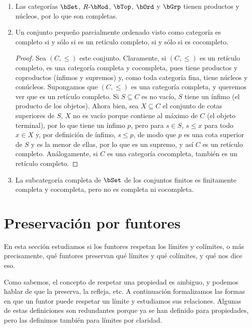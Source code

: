 \begin{example}\;
  \begin{enumerate}
  \item Las categorías $\bSet$, $R\dash\bMod$, $\bTop$, $\bOrd$ y $\bGrp$ tienen
    productos y núcleos, por lo que son completas.\pagebreak
  \item Un conjunto pequeño parcialmente ordenado visto como categoría es
    completo si y sólo si es un retículo completo, si y sólo si es
    cocompleto.\nopagebreak
    \begin{proof}
      Sea $(C,\leq)$ este conjunto. Claramente, si $(C,\leq)$ es un retículo
      completo, es una categoría completa y cocompleta, pues tiene productos y
      coproductos (ínfimos y supremos) y, como toda categoría fina, tiene
      núcleos y conúcleos. Supongamos que $(C,\leq)$ es una categoría completa,
      y queremos ver que es un retículo completo. Si $S\subseteq C$ es no vacío,
      $S$ tiene un ínfimo (el producto de los objetos). Ahora bien, sea
      $X\subseteq C$ el conjunto de cotas superiores de $S$, $X$ no es vacío
      porque contiene al máximo de $C$ (el objeto terminal), por lo que tiene un
      ínfimo $p$, pero para $s\in S$, $s\leq x$ para todo $x\in X$ y, por
      definición de ínfimo, $s\leq p$, de modo que $p$ es una cota superior de
      $S$ y es la menor de ellas, por lo que es un supremo, y así $C$ es un
      retículo completo. Análogamente, si $C$ es una categoría cocompleta,
      también es un retículo completo.
    \end{proof}
  \item La subcategoría completa de $\bSet$ de los conjuntos finitos es
    finitamente completa y cocompleta, pero no es completa ni cocompleta.
  \end{enumerate}
\end{example}

\section{Preservación por funtores}

En esta sección estudiamos si los funtores respetan los límites y colímites, o
más precisamente, qué funtores preservan qué límites y qué colímites, y qué nos
dice eso.

Como sabemos, el concepto de respetar una propiedad es ambiguo, y podemos hablar
de que la preserva, la refleja, etc. A continuación formalizamos las formas en
que un funtor puede respetar un límite y estudiamos sus relaciones. Algunas de
estas definiciones son redundantes porque ya se han definido para propiedades,
pero las definimos también para límites por claridad.

